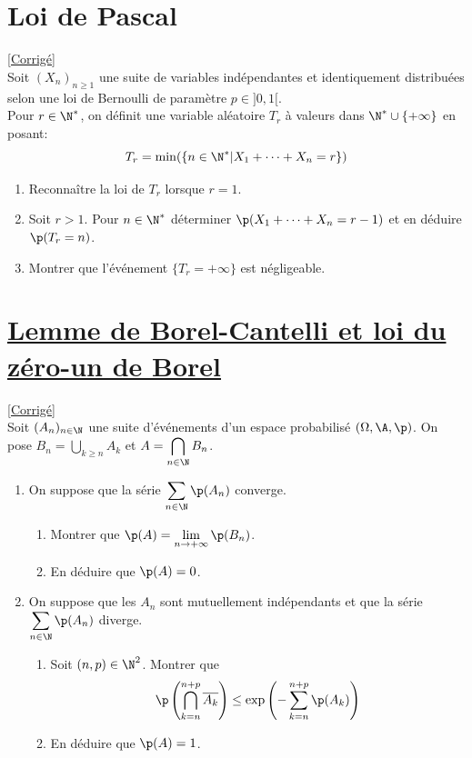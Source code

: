 \documentclass[8pt]{book}
\begin{document}
\section{Loi de Pascal }
\label{Loi de Pascal}
\textcolor{blue}{\hyperref[Loi de Pascal corrigé]{[Corrigé]}}\\
Soit $(X_n)_{n\geq 1}$ une suite de variables indépendantes et identiquement distribuées selon une loi de Bernoulli de paramètre $p\in]0,1[$.
\\Pour $r\in\N^*$, on définit une variable aléatoire $T_r$ à valeurs dans $\N^*\cup\{+\infty\}$ en posant: $$T_r=\min(\{n\in\N^*|X_1+\dots+X_n=r\})$$
\begin{enumerate}
	\item Reconnaître la loi de $T_r$ lorsque $r=1$.
	\item Soit $r>1$. Pour $n\in\N^*$ déterminer $\p(X_1+\dots+X_n=r-1)$ et en déduire $\p(T_r=n)$.
	\item Montrer que l'événement $\{T_r=+\infty\}$ est négligeable.
\end{enumerate}

\section{\underline{Lemme de Borel-Cantelli et loi du zéro-un de Borel} }
\label{Lemme de Borel-Cantelli et loi du zéro-un de Borel}
\textcolor{blue}{\hyperref[Lemme de Borel-Cantelli et loi du zéro-un de Borel corrigé]{[Corrigé]}}\\
Soit $(A_n)_{n\in\N}$ une suite d'événements d'un espace probabilisé $(\Omega,\A,\p)$. On pose $B_n=\displaystyle\bigcup\limits_{k\geq n}A_k$ et $A=\displaystyle\bigcap\limits_{n\in\N}B_n$.
\begin{enumerate}
	\item On suppose que la série $\displaystyle\sum\limits_{n\in\N}\p(A_n)$ converge.
	\begin{enumerate}[label=\alph*.]
		\item Montrer que $\p(A)=\lim\limits_{n\to+\infty}\p(B_n)$.
		\item En déduire que $\p(A)=0$.
	\end{enumerate}
	\item On suppose que les $A_n$ sont mutuellement indépendants et que la série $\displaystyle\sum\limits_{n\in\N}\p(A_n)$ diverge.
	\begin{enumerate}[label=\alph*.]
		\item Soit $(n,p)\in\N^2$. Montrer que $$\p\left(\bigcap\limits_{k=n}^{n+p}\overline{A_k}\right)\leq \exp\left(-\sum\limits_{k=n}^{n+p}\p(A_k)\right)$$
		\item En déduire que $\p(A)=1$.
	\end{enumerate}
\end{enumerate}
\end{document}
